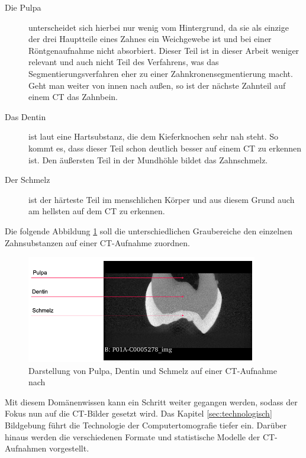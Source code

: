 \begin{description}
	\item[Die Pulpa] unterscheidet sich hierbei nur wenig vom Hintergrund, da sie
		als einzige der drei Hauptteile eines Zahnes ein Weichgewebe ist und bei
		einer Röntgenaufnahme nicht absorbiert. Dieser Teil ist in dieser Arbeit weniger
		relevant und auch nicht Teil des Verfahrens, was das Segmentierungsverfahren
		eher zu einer Zahnkronensegmentierung macht. Geht man weiter von innen nach außen,
		so ist der nächste Zahnteil auf einem \ac{CT} das Zahnbein.

	\item[Das Dentin] ist laut \citet[S.~41]{lehmann2012Zahnheilkunde} eine
		Hartsubstanz, die dem Kieferknochen sehr nah steht. So kommt es, dass dieser
		Teil schon deutlich besser auf einem \ac{CT} zu erkennen ist. Den äußersten Teil
		in der Mundhöhle bildet das Zahnschmelz.

	\item[ Der Schmelz] ist der härteste Teil im menschlichen Körper und aus diesem
		Grund auch am hellsten auf dem \ac{CT} zu erkennen.
\end{description}

Die folgende Abbildung \ref{fig:pulpa_dentin_schmelz} soll die unterschiedlichen
Graubereiche den einzelnen Zahnsubstanzen auf einer \ac{CT}-Aufnahme zuordnen.

\begin{figure}[h]
	\centering
	\includegraphics[width=0.9\textwidth]{img/dentin_schmelz_pulpa.png}
	\caption{Darstellung von Pulpa, Dentin und Schmelz auf einer CT-Aufnahme nach \citet{heck2024}}
	\label{fig:pulpa_dentin_schmelz}
\end{figure}

Mit diesem Domänenwissen kann ein Schritt weiter gegangen werden, sodass der
Fokus nun auf die \ac{CT}-Bilder gesetzt wird. Das Kapitel
\ref{sec:technologisch} Bildgebung führt die Technologie der Computertomografie
tiefer ein. Darüber hinaus werden die verschiedenen Formate und statistische Modelle
der \ac{CT}-Aufnahmen vorgestellt.


